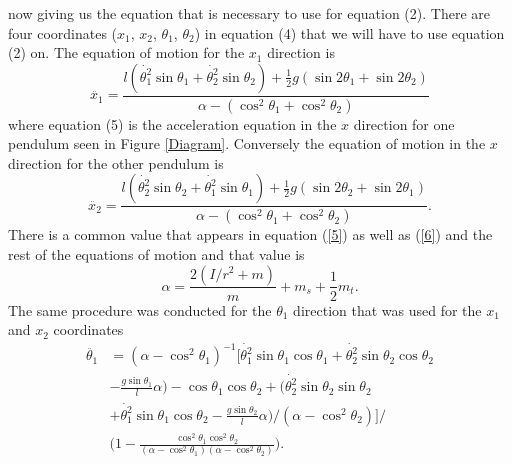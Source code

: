 \documentclass[twocolumn]{article}
\begin{document}
now giving us the equation that is necessary to use for equation (2). There are four coordinates ($x_1$, $x_2$, $\theta_{1}$, $\theta_{2}$) in equation (4) that we will have to use equation (2) on. The equation of motion for the $x_1$ direction is
\begin{equation}\label{5}
\ddot{x_1}=\frac{l(\dot{\theta_{1}^2}\sin{\theta_{1}}+\dot{\theta_{2}^2}\sin{\theta_{2}})+\frac{1}{2}g(\sin{2\theta_{1}}+\sin{2\theta_{2}})}{\alpha-(\cos^2{\theta_{1}}+\cos^2{\theta_{2}})}
\end{equation}
where equation (5) is the acceleration equation in the $x$ direction for one pendulum seen in Figure \ref{Diagram}. Conversely the equation of motion in the $x$ direction for the other pendulum is
\begin{equation}\label{6}
\ddot{x_2}=\frac{l(\dot{\theta_{2}^2}\sin{\theta_{2}}+\dot{\theta_{1}^2}\sin{\theta_{1}})+\frac{1}{2}g(\sin{2\theta_{2}}+\sin{2\theta_{1}})}{\alpha-(\cos^2{\theta_{1}}+\cos^2{\theta_{2}})}.
\end{equation}
There is a common value that appears in equation (\ref{5}) as well as (\ref{6}) and the rest of the equations of motion and that value is
\begin{equation}\label{7}
\alpha = \frac{2(I/r^2+m)}{m}+m_s+\frac{1}{2}m_t. 
\end{equation}
The same procedure was conducted for the $\theta_1$ direction that was used for the $x_1$ and $x_2$ coordinates
\begin{equation}\label{8}
\begin{split}
\ddot{\theta_{1}}&=(\alpha-\cos^2{\theta_1})^{-1}\Bigg[\dot{\theta_{1}^2}\sin{\theta_{1}}\cos{\theta_{1}}+\dot{\theta_{2}^2}\sin{\theta_{2}}\cos{\theta_{2}}\\&
-\frac{g\sin{\theta_{1}}}{l}\alpha)-\cos{\theta_{1}}\cos{\theta_{2}}+\Big(\dot{\theta_{2}^2}\sin{\theta_{2}}\sin{\theta_{2}}\\&
+\dot{\theta_{1}^2}\sin{\theta_{1}}\cos{\theta_{2}}-\frac{g\sin{\theta_{2}}}{l}\alpha\Big)/(\alpha-\cos^2{\theta_2})\Bigg]/ \\&
\Bigg(1-\frac{\cos^2{\theta_{1}}\cos^2{\theta_{2}}}{(\alpha-\cos^2{\theta_1})(\alpha-\cos^2{\theta_2})}\Bigg).
\end{split}
\end{equation}
\end{document}
